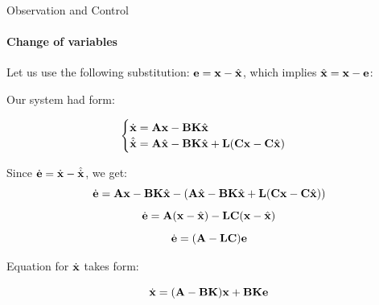 \documentclass{beamer}
\begin{document}
\begin{frame}{Observation and Control}
\framesubtitle{Change of variables}
\begin{flushleft}

Let us use the following substitution: $\mathbf{e} = \mathbf{x} - \hat{\mathbf{x}}$, which implies $\hat{\mathbf{x}} = \mathbf{x} - \mathbf{e}$:

Our system had form:

\begin{equation}
\begin{cases}
\dot {\mathbf{x}} = \mathbf{A} \mathbf{x} - \mathbf{B}\mathbf{K} \hat{\mathbf{x}} \\
\hat{\dot {\mathbf{x}}} = \mathbf{A} \hat{\mathbf{x}} - \mathbf{B}\mathbf{K} \hat{\mathbf{x}} + \mathbf{L}(\mathbf{C} \mathbf{x} - \mathbf{C} \hat{\mathbf{x}})
\end{cases}
\end{equation}

Since $\dot{\mathbf{e}} = \dot{\mathbf{x}} - \hat{\dot{\mathbf{x}}}$, we get:
%
\[
\dot{\mathbf{e}} = 
\mathbf{A} \mathbf{x} - \mathbf{B}\mathbf{K} \hat{\mathbf{x}} - 
(\mathbf{A} \hat{\mathbf{x}} - \mathbf{B}\mathbf{K} \hat{\mathbf{x}} + \mathbf{L}(\mathbf{C} \mathbf{x} - \mathbf{C} \hat{\mathbf{x}}))
\]
%
\[
\dot{\mathbf{e}} = 
\mathbf{A} (\mathbf{x} - \hat{\mathbf{x}})  - \mathbf{L}\mathbf{C}(\mathbf{x} - \hat{\mathbf{x}})
\]
%
\[
\dot{\mathbf{e}} = 
(\mathbf{A}  - \mathbf{L}\mathbf{C})\mathbf{e}
\]

Equation for $\dot {\mathbf{x}}$ takes form:

\[
\dot {\mathbf{x}} = (\mathbf{A}-\mathbf{B}\mathbf{K}) \mathbf{x} +  \mathbf{B}\mathbf{K}\mathbf{e}
\]


\end{flushleft}
\end{frame}
\end{document}
